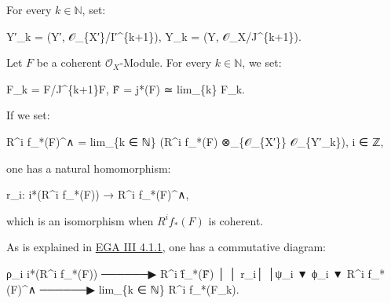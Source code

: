 \documentclass[
  11pt,
  a4paper,
]{book}
\newenvironment{Shaded}{}{}
\newcommand{\NormalTok}[1]{#1}
\begin{document}
For every \(k \in \mathbb{N}\), set:

\begin{Shaded}
\begin{Highlighting}[]
\NormalTok{Y′\_k = (Y′, 𝒪\_\{X′\}/I′\^{}\{k+1\}),    Y\_k = (Y, 𝒪\_X/J\^{}\{k+1\}).}
\end{Highlighting}
\end{Shaded}

Let \(F\) be a coherent \(\mathcal{O}_{X}\)-Module. For every
\(k \in \mathbb{N}\), we set:

\begin{Shaded}
\begin{Highlighting}[]
\NormalTok{F\_k = F/J\^{}\{k+1\}F,    F̂ = j*(F) ≃ lim\_\{k\} F\_k.}
\end{Highlighting}
\end{Shaded}

If we set:

\begin{Shaded}
\begin{Highlighting}[]
\NormalTok{R\^{}i f\_*(F)\^{}∧ = lim\_\{k ∈ ℕ\} (R\^{}i f\_*(F) ⊗\_\{𝒪\_\{X′\}\} 𝒪\_\{Y′\_k\}),    i ∈ ℤ,}
\end{Highlighting}
\end{Shaded}

one has a natural homomorphism:

\begin{Shaded}
\begin{Highlighting}[]
\NormalTok{r\_i: i*(R\^{}i f\_*(F)) → R\^{}i f\_*(F)\^{}∧,}
\end{Highlighting}
\end{Shaded}

which is an isomorphism when \(R^{i} f_{*}(F)\) is coherent.

As is explained in
\href{https://jcreinhold.github.io/ega/iii/11-ch3-04-fundamental-theorem-proper-morphisms.html\#41-the-fundamental-theorem}{EGA
III 4.1.1}, one has a commutative diagram:

\begin{Shaded}
\begin{Highlighting}[]
\NormalTok{                       ρ\_i}
\NormalTok{   i*(R\^{}i f\_*(F))  ──────▶  R\^{}i f̂\_*(F̂)}
\NormalTok{        │                       │}
\NormalTok{     r\_i│                       │ψ\_i}
\NormalTok{        ▼          ϕ\_i          ▼}
\NormalTok{   R\^{}i f\_*(F)\^{}∧  ──────▶  lim\_\{k ∈ ℕ\} R\^{}i f\_*(F\_k).}
\end{Highlighting}
\end{Shaded}
\end{document}
